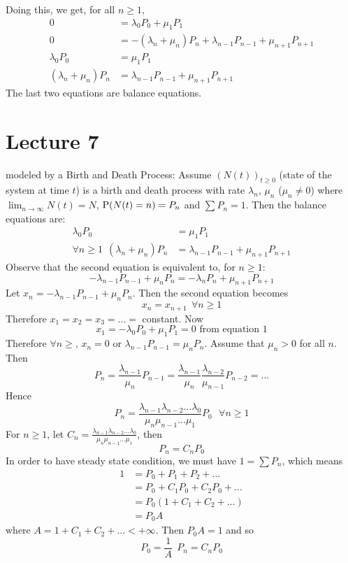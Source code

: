 \documentclass[12pt]{article}
\begin{document}
Doing this, we get, for all $n \geq 1$, $$ \begin{aligned} 
0 &= \lambda_0P_0 + \mu_1P_1 \\ 0 &= -(\lambda_n + \mu_n)P_n + \lambda_{n-1}P_{n-1} + \mu_{n+1}P_{n+1} \\ \lambda_0P_0 &= \mu_1P_1 \\ (\lambda_n + \mu_n)P_n &= \lambda_{n-1}P_{n-1} + \mu_{n+1}P_{n+1} \end{aligned} $$ 
The last two equations are balance equations. 
 
 \section{Lecture 7} 
\qs modeled by a Birth and Death Process: Assume $(N(t))_{t\geq0}$ (state of the system at time $t$) is a birth and death process with rate $\lambda_n$, $\mu_n$ ($\mu_n \neq 0$) where $\lim_{n\to\infty} N(t) = N$, $\mathrm{P}( N(t) = n ) = P_n$ and $\sum P_n = 1$. Then the balance equations are: $$ \begin{aligned} \lambda_0P_0 &= \mu_1P_1 \\ \forall n \geq 1~~ (\lambda_n + \mu_n)P_n &= \lambda_{n-1}P_{n-1} + \mu_{n+1}P_{n+1} \end{aligned} $$ 
Observe that the second equation is equivalent to, for $n \geq 1$: 
$$ -\lambda_{n-1}P_{n-1} + \mu_nP_n = -\lambda_nP_n + \mu_{n+1}P_{n+1} $$ 
Let $x_n = -\lambda_{n-1}P_{n-1} + \mu_nP_n$. Then the second equation becomes $$ x_n = x_{n+1} ~~ \forall n \geq 1 $$ 
Therefore $x_1 = x_2 = x_3 = \dots = $ constant. Now $$x_1 = -\lambda_0P_0 + \mu_1P_1 = 0 \text{ from equation 1} $$ 
Therefore $\forall n \geq$, $x_n = 0$ or $\lambda_{n-1}P_{n-1} = \mu_nP_n$. Assume that $\mu_n > 0$ for all $n$. Then $$P_n = \frac{\lambda_{n-1}}{\mu_n}P_{n-1} = \frac{\lambda_{n-1}}{\mu_n}\frac{\lambda_{n-2}}{\mu_{n-1}}P_{n-2} = \dots $$ 
Hence $$ P_n = \frac{\lambda_{n-1}\lambda_{n-2}\dots\lambda_0}{\mu_n\mu_{n-1}\dots\mu_{1}} P_0 ~~~\forall n \geq 1 $$ 
For $n\geq 1$, let $C_n = \frac{\lambda_{n-1}\lambda_{n-2}\dots\lambda_0}{\mu_n\mu_{n-1}\dots\mu_{1}}$, then $$P_n = C_nP_0$$ 
In order to have steady state condition, we must have $1 = \sum P_n$, which means 
$$ \begin{aligned} 1 &= P_0 + P_1 + P_2 + \dots \\ &= P_0 + C_1P_0 + C_2P_0 + \dots \\ 
&= P_0(1 + C_1 + C_2 + \dots) \\ &= P_0A \end{aligned} $$ where $A = 1 + C_1 + C_2 + \dots < +\infty$. Then $P_0A = 1$ and so $$ P_0 = \frac{1}{A} ~~ P_n = C_nP_0$$ 
\end{document}
